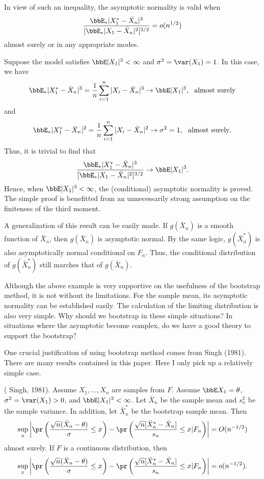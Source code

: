 In view of such an inequality, the asymptotic normality is valid when
\[
\frac{\bbE_*|X_1^* - \bar X_n|^3}
{[\bbE_*|X_1 - \bar X_n|^2]^{3/2}} 
=o(n^{1/2})
\]
almost surely or in any appropriate modes.

Suppose the model satisfies $\bbE|X_1|^3 < \infty$
and $\sigma^2 = \var(X_1)  = 1$.
In this case, we have
\[
\bbE_*|X_1^* - \bar X_n|^3 
= 
\frac{1}{n} \sum_{i=1}^n |X_i - \bar X_n|^3
\rightarrow 
\bbE |X_1|^3,~~\mbox{almost surely}
\]
and
\[
\bbE_*|X_1^* - \bar X_n|^2 = \frac{1}{n} \sum_{i=1}^n |X_i - \bar X_n|^2
\rightarrow \sigma^2 = 1, ~~\mbox{almost surely}.
\]
Thus, it is trivial to find that 
\[
\frac{\bbE_*|X_1^* - \bar X_n|^3} {[\bbE_*|X_1 - \bar X_n|^2]^{3/2}}
\rightarrow 
\bbE |X_1|^3.
\]
Hence, when $\bbE|X_1|^3 < \infty$, the (conditional)
asymptotic normality is proved. The simple proof is benefitted
from an unnecessarily strong assumption on the finiteness
of the  third moment.

A generalization of this result can be easily made. If $g(\bar X_n)$ is a smooth
function of $\bar X_n$, then $g(\bar X_n)$ is asymptotic normal.
By the same logic, $g(\bar X_n^*)$ is also asymptotically normal
conditional on $F_n$. Thus, the conditional distribution of
$g(\bar X_n^*)$ still marches that of $g(\bar X_n)$. 

Although the above example is very supportive on the usefulness of
the bootstrap method, it is not without its limitations. For the sample
mean, its asymptotic normality can be established easily. The calculation
of the limiting distribution is also very simple. 
Why should we bootstrap in these simple situations?
In situations where the asymptotic become complex, do we have a good
theory to support the bootstrap?

One crucial justification of using bootstrap method comes from
Singh (1981). There are many results contained in this paper. Here
I only pick up a relatively simple case.

\begin{theorem}
( Singh, 1981).
Assume $X_1, \ldots, X_n$ are \iid samples from $F$.
Assume $\bbE X_1 = \theta$, $\sigma^2 = \var(X_1) > 0$, 
and $\bbE |X_1|^3 < \infty$.
Let $\bar X_n$ be the sample mean and $s_n^2$ be the sample variance.
In addition, let $\bar X_n^*$ be the bootstrap sample mean. Then
\[
\sup_x 
\left |
\pr
\left (
\frac{\sqrt{n} (\bar X_n - \theta)}{\sigma} \leq x 
\right )
- \pr 
\left (
\frac{\sqrt{n}[\bar X_n^* - \bar X_n]}{s_n} \leq x| F_n 
\right )
\right |
= O (n^{-1/2})
\]
almost surely.
If $F$ is a continuous distribution, then
\[
\sup_x 
\left |
\pr
\left(
\frac{\sqrt{n}(\bar X_n- \theta)}{\sigma} \leq x
\right)
- 
\pr
\left (
\frac{\sqrt{n}[\bar X_n^* - \bar X_n]}{s_n} \leq x| F_n
\right)
\right |
= o(n^{-1/2}).
\]
\end{theorem}

